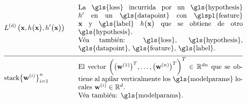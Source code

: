 \begin{align} 
   &\gtvloss{\featurevec}{\hypothesis\big(\featurevec\big)}{\hypothesis'\big(\featurevec\big)}& \quad & \parbox{.70\textwidth}{La \gls{loss} 
	   incurrida por un \gls{hypothesis} $\hypothesis'$ en un \gls{datapoint} con \glspl{feature} $\featurevec$ y \gls{label} 
	   $\hypothesis\big( \featurevec\big)$ que se obtiene de otro \gls{hypothesis}.
	   \\ Véa también: \gls{loss}, \gls{hypothesis}, \gls{datapoint}, \gls{feature}, \gls{label}.} \nonumber \\[2mm] \hline \nonumber\\[-5mm]
   &{\rm stack} \big\{ \weights^{(\nodeidx)} \big\}_{\nodeidx=1}^{\nrnodes} & \quad & \parbox{.70\textwidth}{El vector 
	   $\bigg( \big(\weights^{(1)}  \big)^{T}, \ldots, \big(\weights^{(\nrnodes)}  \big)^{T} \bigg)^{T} \in \mathbb{R}^{\dimlocalmodel\nrnodes}$ que 
	   se obtiene al apilar verticalmente los \gls{modelparams} locales $\weights^{(\nodeidx)} \in \mathbb{R}^{\dimlocalmodel}$.
	   \\ Véa también: \gls{modelparams}.} \nonumber 
\end{align}